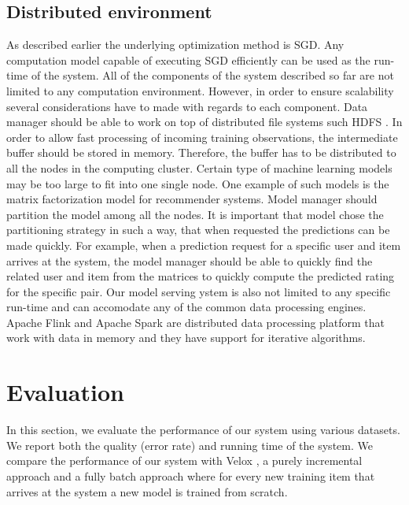 \documentclass{sig-alternate-05-2015}
\begin{document}
\subsection{Distributed environment} 
As described earlier the underlying optimization method is SGD.
Any computation model capable of executing SGD efficiently can be used as the run-time of the system.
All of the components of the system described so far are not limited to any computation environment.
However, in order to ensure scalability several considerations have to made with regards to each component.
Data manager should be able to work on top of distributed file systems such HDFS \cite{shvachko2010hadoop}. 
In order to allow fast processing of incoming training observations, the intermediate buffer should be stored in memory.
Therefore, the buffer has to be distributed to all the nodes in the computing cluster.
Certain type of machine learning models may be too large to fit into one single node.
One example of such models is the matrix factorization model for recommender systems.
Model manager should partition the model among all the nodes.
It is important that model chose the partitioning strategy in such a way, that when requested the predictions can be made quickly.
For example, when a prediction request for a specific user and item arrives at the system, the model manager should be able to quickly find the related user and item from the matrices to quickly compute the predicted rating for the specific pair.
Our model serving ystem is also not limited to any specific run-time and can accomodate any of the common data processing engines.
Apache Flink \cite{carbone2015apache, alexandrov2014stratosphere} and Apache Spark \cite{zaharia2010spark} are distributed data processing platform that work with data in memory and they have support for iterative algorithms.


\section{Evaluation} \label{evaluation} 
In this section, we evaluate the performance of our system using various datasets. 
We report both the quality (error rate) and running time of the system. 
We compare the performance of our system with Velox \cite{crankshaw2014missing}, a purely incremental approach and a fully batch approach where for every new training item that arrives at the system a new model is trained from scratch.
\end{document}
